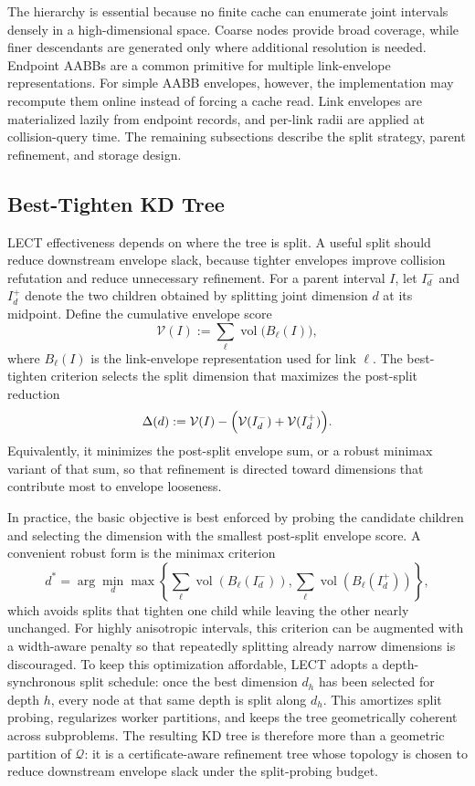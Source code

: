 \documentclass[journal]{IEEEtran}
\newcommand{\Q}{\ensuremath{\mathcal{Q}}}
\begin{document}
The hierarchy is essential because no finite cache can enumerate joint
intervals densely in a high-dimensional space. Coarse nodes provide broad
coverage, while finer descendants are generated only where additional
resolution is needed. Endpoint AABBs are a common primitive for multiple
link-envelope representations. For simple AABB envelopes, however, the
implementation may recompute them online instead of forcing a cache read. Link
envelopes are materialized lazily from endpoint records, and per-link radii are
applied at collision-query time. The remaining subsections describe the split
strategy, parent refinement, and storage design.

\subsection{Best-Tighten KD Tree}
\label{sec:lect_split}

LECT effectiveness depends on where the tree is split. A useful split should
reduce downstream envelope slack, because tighter envelopes improve collision
refutation and reduce unnecessary refinement. For a parent interval $I$, let
$I_d^{-}$ and $I_d^{+}$ denote the two children obtained by splitting joint
dimension $d$ at its midpoint. Define the cumulative envelope score
\[
\mathcal{V}(I) := \sum_{\ell} \operatorname{vol}\bigl(B_\ell(I)\bigr),
\]
where $B_\ell(I)$ is the link-envelope representation used for link $\ell$.
The best-tighten criterion selects the split dimension that maximizes the
post-split reduction
\[
\Delta(d) := \mathcal{V}(I)
- \Bigl(\mathcal{V}(I_d^{-}) + \mathcal{V}(I_d^{+})\Bigr).
\]
Equivalently, it minimizes the post-split envelope sum, or a robust minimax
variant of that sum, so that refinement is directed toward dimensions that
contribute most to envelope looseness.

In practice, the basic objective is best enforced by probing the candidate
children and selecting the dimension with the smallest post-split envelope
score. A convenient robust form is the minimax criterion
\[
d^* = \arg\min_d
\max\!\left\{\sum_{\ell}\operatorname{vol}(B_\ell(I_d^-)),
\sum_{\ell}\operatorname{vol}(B_\ell(I_d^+))\right\},
\]
which avoids splits that tighten one child while leaving the other
nearly unchanged. For highly anisotropic intervals, this criterion can be
augmented with a width-aware penalty so that repeatedly splitting already
narrow dimensions is discouraged. To keep this optimization affordable, LECT
adopts a depth-synchronous split schedule: once the best dimension $d_h$ has
been selected for depth $h$, every node at that same depth is split along
$d_h$. This amortizes split probing, regularizes worker partitions, and keeps
the tree geometrically coherent across subproblems. The resulting KD tree is
therefore more than a geometric partition of $\Q$: it is a
certificate-aware refinement tree whose topology is chosen to reduce downstream
envelope slack under the split-probing budget.
\end{document}
